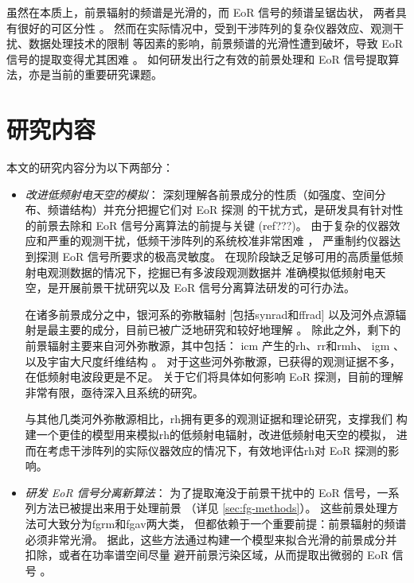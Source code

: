 虽然在本质上，前景辐射的频谱是光滑的，而 EoR 信号的频谱呈锯齿状，
两者具有很好的可区分性 \cite{wang2006,jelic2008,harker2009,wang2013}。
然而在实际情况中，受到干涉阵列的复杂仪器效应、观测干扰、数据处理技术的限制
等因素的影响，前景频谱的光滑性遭到破坏，导致 EoR 信号的提取变得尤其困难
\cite{liu2009ps,labropoulos2009,gehlot2018,mertens2018}。
如何研发出行之有效的前景处理和 EoR 信号提取算法，亦是当前的重要研究课题。


\section{研究内容}
\label{sec:content}

本文的研究内容分为以下两部分：
\begin{itemize}
\item
\emph{改进低频射电天空的模拟}：
深刻理解各前景成分的性质（如强度、空间分布、频谱结构）并充分把握它们对 EoR 探测
的干扰方式，是研发具有针对性的前景去除和 EoR 信号分离算法的前提与关键 (ref???)。
由于复杂的仪器效应和严重的观测干扰，低频干涉阵列的系统校准非常困难
\cite{noordam2004,intema2009,wijnholds2010,barry2016,gehlot2018}，
严重制约仪器达到探测 EoR 信号所要求的极高灵敏度。
在现阶段缺乏足够可用的高质量低频射电观测数据的情况下，挖掘已有多波段观测数据并
准确模拟低频射电天空，是开展前景干扰研究以及 EoR 信号分离算法研发的可行办法。

在诸多前景成分之中，银河系的弥散辐射 [包括\ac{synrad}和\ac{ffrad}]
以及河外点源辐射是最主要的成分，目前已被广泛地研究和较好地理解
\cite{shaver1999,diMatteo2004,gleser2008,liu2012,murray2017,spinelli2018}。
除此之外，剩下的前景辐射主要来自河外弥散源，其中包括：
\ac{icm} \cite{feretti2012rev} 产生的\ac{rh}、\ac{rr}和\ac{rmh}、
\ac{igm} \cite{keshet2004}、以及宇宙大尺度纤维结构 \cite{vazza2015}。
对于这些河外弥散源，已获得的观测证据不多，在低频射电波段更是不足。
关于它们将具体如何影响 EoR 探测，目前的理解非常有限，亟待深入且系统的研究。

与其他几类河外弥散源相比，\acl{rh}拥有更多的观测证据和理论研究，支撑我们
构建一个更佳的模型用来模拟\acl{rh}的低频射电辐射，改进低频射电天空的模拟，
进而在考虑干涉阵列的实际仪器效应的情况下，有效地评估\acl{rh}对 EoR 探测的影响。

\item
\emph{研发 EoR 信号分离新算法}：
为了提取淹没于前景干扰中的 EoR 信号，一系列方法已被提出来用于处理前景
（详见 \autoref{sec:fg-methods}）。
这些前景处理方法可大致分为\ac{fgrm}和\ac{fgav}两大类，
但都依赖于一个重要前提：前景辐射的频谱必须非常光滑。
据此，这些方法通过构建一个模型来拟合光滑的前景成分并扣除，或者在功率谱空间尽量
避开前景污染区域，从而提取出微弱的 EoR 信号 \cite{chapman2016}。


\end{itemize}
